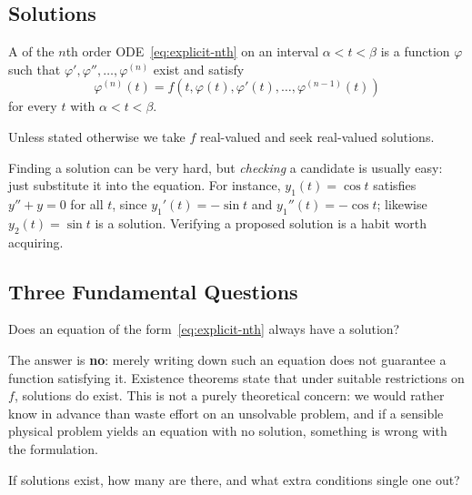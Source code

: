 \subsection{Solutions}

\begin{definition}[Solution]\label{def:solution}
	A  of the \(n\)th order ODE~\eqref{eq:explicit-nth} on an interval
	\(\alpha < t < \beta\) is a function \(\varphi\) such that
	\(\varphi', \varphi'', \dots, \varphi^{(n)}\) exist and satisfy
	\[
		\varphi^{(n)}(t) = f\left( t, \varphi(t), \varphi'(t), \dots,
		\varphi^{(n-1)}(t) \right)
	\]
	for every \(t\) with \(\alpha < t < \beta\).
\end{definition}

Unless stated otherwise we take \(f\) real-valued and seek real-valued solutions.

\begin{observation}
	Finding a solution can be very hard, but \emph{checking} a candidate is usually easy:
	just substitute it into the equation. For instance, \(y_1(t) = \cos t\) satisfies
	\(y'' + y = 0\) for all \(t\), since \(y_1'(t) = -\sin t\) and \(y_1''(t) = -\cos t\);
	likewise \(y_2(t) = \sin t\) is a solution. Verifying a proposed solution is a habit
	worth acquiring.
\end{observation}

\subsection{Three Fundamental Questions}

\begin{question}[Existence]
	Does an equation of the form~\eqref{eq:explicit-nth} always have a solution?
\end{question}

The answer is \textbf{no}: merely writing down such an equation does not guarantee a
function satisfying it. Existence theorems state that under suitable restrictions on
\(f\), solutions do exist. This is not a purely theoretical concern: we would rather know
in advance than waste effort on an unsolvable problem, and if a sensible physical problem
yields an equation with no solution, something is wrong with the formulation.

\begin{question}[Uniqueness]
	If solutions exist, how many are there, and what extra conditions single one out?
\end{question}

